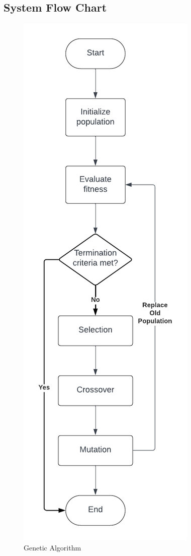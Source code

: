 \begin{appendices}
	
	\begin{centerappendixtitle}
		\chapter{System Flow Chart}
		\pagebreak
		
		\begin{figure}[h]
			\centering
			\caption{Genetic Algorithm}
			\label{genalgoFlow}
			\includegraphics[width=\linewidth]{appendix/Genetic Algorithm Flowchart}

\end{figure}
\end{centerappendixtitle}
\end{appendices}
